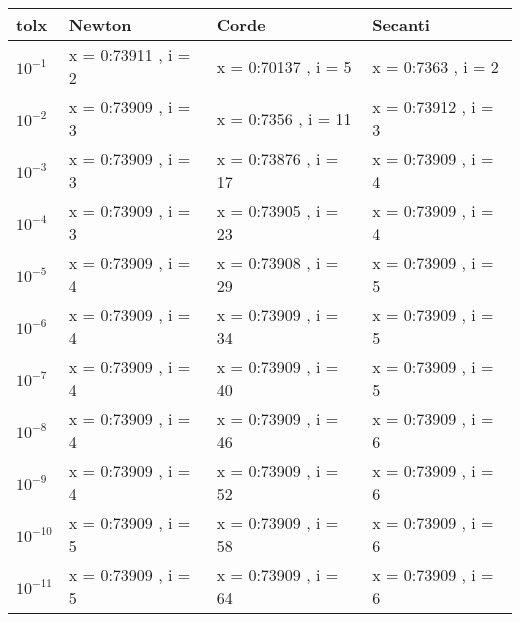 \documentclass[20pt,a4paper]{book}
\begin{document}
\begin{tabular}{|l|l|l|l|}
\hline
tolx & Newton & Corde & Secanti\\
\hline
\begin{math}10^{-1}\end{math} & x = 0:73911 , i = 2 & x = 0:70137 , i = 5 & x = 0:7363 , i = 2\\
\hline
\begin{math}10^{-2}\end{math} & x = 0:73909 , i = 3 & x = 0:7356 , i = 11 & x = 0:73912 , i = 3\\
\hline
\begin{math}10^{-3}\end{math} & x = 0:73909 , i = 3 & x = 0:73876 , i = 17 & x = 0:73909 , i = 4\\
\hline
\begin{math}10^{-4}\end{math} & x = 0:73909 , i = 3 & x = 0:73905 , i = 23 & x = 0:73909 , i = 4\\
\hline
\begin{math}10^{-5}\end{math} & x = 0:73909 , i = 4 & x = 0:73908 , i = 29 & x = 0:73909 , i = 5\\
\hline
\begin{math}10^{-6}\end{math} & x = 0:73909 , i = 4 & x = 0:73909 , i = 34 & x = 0:73909 , i = 5\\
\hline
\begin{math}10^{-7}\end{math} & x = 0:73909 , i = 4 & x = 0:73909 , i = 40 & x = 0:73909 , i = 5\\
\hline
\begin{math}10^{-8}\end{math} & x = 0:73909 , i = 4 & x = 0:73909 , i = 46 & x = 0:73909 , i = 6\\
\hline
\begin{math}10^{-9}\end{math} & x = 0:73909 , i = 4 & x = 0:73909 , i = 52 & x = 0:73909 , i = 6\\
\hline
\begin{math}10^{-10}\end{math} & x = 0:73909 , i = 5 & x = 0:73909 , i = 58 & x = 0:73909 , i = 6\\
\hline
\begin{math}10^{-11}\end{math} & x = 0:73909 , i = 5 & x = 0:73909 , i = 64 & x = 0:73909 , i = 6\\

\end{tabular}
\end{document}
